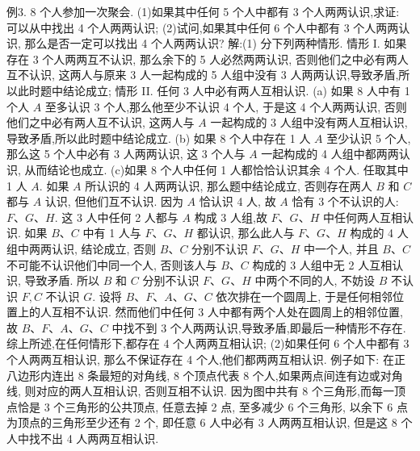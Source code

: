 例3. 8 个人参加一次聚会.
(1)如果其中任何 5 个人中都有 3 个人两两认识,求证: 可以从中找出 4 个人两两认识;
(2)试问,如果其中任何 6 个人中都有 3 个人两两认识, 那么是否一定可以找出 4 个人两两认识?
解:(1) 分下列两种情形.
情形 I. 如果存在 3 个人两两互不认识, 那么余下的 5 人必然两两认识, 否则他们之中必有两人互不认识, 这两人与原来 3 人一起构成的 5 人组中没有 3 人两两认识,导致矛盾,所以此时题中结论成立;
情形 II. 任何 3 人中必有两人互相认识.
(a) 如果 8 人中有 1 个人 $A$ 至多认识 3 个人,那么他至少不认识 4 个人, 于是这 4 个人两两认识, 否则他们之中必有两人互不认识, 这两人与 $A$ 一起构成的 3 人组中没有两人互相认识,导致矛盾,所以此时题中结论成立.
(b) 如果 8 个人中存在 1 人 $A$ 至少认识 5 个人,那么这 5 个人中必有 3 人两两认识, 这 3 个人与 $A$ 一起构成的 4 人组中都两两认识, 从而结论也成立.
(c)如果 8 个人中任何 1 人都恰恰认识其余 4 个人.
任取其中 1 人 $A$. 如果 $A$ 所认识的 4 人两两认识, 那么题中结论成立, 否则存在两人 $B$ 和 $C$ 都与 $A$ 认识, 但他们互不认识.
因为 $A$ 恰认识 4 人, 故 $A$ 恰有 3 个不认识的人: $F 、 G 、 H$. 这 3 人中任何 2 人都与 $A$ 构成 3 人组,故 $F 、 G 、 H$ 中任何两人互相认识.
如果 $B 、 C$ 中有 1 人与 $F 、 G 、 H$ 都认识, 那么此人与 $F 、 G 、 H$ 构成的 4 人组中两两认识, 结论成立, 否则 $B 、 C$ 分别不认识 $F 、 G 、 H$ 中一个人, 并且 $B 、 C$ 不可能不认识他们中同一个人, 否则该人与 $B 、 C$ 构成的 3 人组中无 2 人互相认识, 导致矛盾.
所以 $B$ 和 $C$ 分别不认识 $F 、G 、 H$ 中两个不同的人, 不妨设 $B$ 不认识 $F, C$ 不认识 $G$. 设将 $B 、 F 、 A 、 G 、 C$ 依次排在一个圆周上, 于是任何相邻位置上的人互相不认识.
然而他们中任何 3 人中都有两个人处在圆周上的相邻位置, 故 $B 、 F 、 A 、 G 、 C$ 中找不到 3 个人两两认识,导致矛盾,即最后一种情形不存在.
综上所述,在任何情形下,都存在 4 个人两两互相认识;
(2)如果任何 6 个人中都有 3 个人两两互相认识, 那么不保证存在 4 个人,他们都两两互相认识.
例子如下:
在正八边形内连出 8 条最短的对角线, 8 个顶点代表 8 个人,如果两点间连有边或对角线, 则对应的两人互相认识, 否则互相不认识.
因为图中共有 8 个三角形,而每一顶点恰是 3 个三角形的公共顶点, 任意去掉 2 点, 至多减少 6 个三角形, 以余下 6 点为顶点的三角形至少还有 2 个, 即任意 6 人中必有 3 人两两互相认识, 但是这 8 个人中找不出 4 人两两互相认识.



